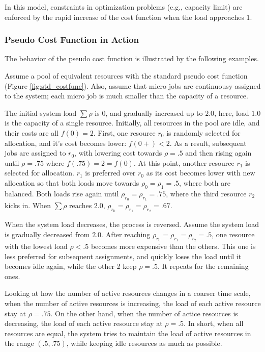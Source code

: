 In this model, constraints in optimization problems (e.g.,
capacity limit) are enforced by the rapid increase of the cost function when
the load approaches $1$. 

\subsubsection{Pseudo Cost Function in Action}

The behavior of the pseudo cost function is illustrated by the
following examples.

Assume a pool of equivalent resources with the standard pseudo cost
function (Figure \ref{fig:std_costfunc}).
Also, assume that micro jobs are continuousy assigned to the
system; each micro job is much smaller than the capacity of a
resource.

The initial system load $\sum \rho$ is $0$, and gradually increased
up to $2.0$, here, load $1.0$ is the capacity of a single resource.
Initially, all resources in the pool are idle, and their costs are
all $f(0)= 2$.
First, one resource $r_{0}$ is randomly selected for allocation, and it's
cost becomes lower: $f(0+) < 2$. As a result, subsequent jobs are
assigned to $r_{0}$, with lowering cost towards $\rho = .5$ and then
rising again until $\rho = .75$ where $f(.75) = 2 = f(0)$.
At this point, another resource $r_{1}$ is selected for allocation.
$r_{1}$ is preferred over $r_{0}$ as its cost becomes lower with new
allocation so that both loads move towards $\rho_{0} = \rho_{1} = .5$,
where both are balanced.
Both loads rise again until $\rho_{r_{0}} = \rho_{r_{1}} = .75$,
where the third resource $r_{2}$ kicks in.
When $\sum \rho$ reaches $2.0$, $\rho_{r_{0}} = \rho_{r_{1}} = \rho_{r_{2}} = .67$.

When the system load decreases, the process is reversed.
Assume the system load is gradually decreased from $2.0$.
After reaching $\rho_{r_{0}} = \rho_{r_{1}} = \rho_{r_{2}} = .5$,
one resource with the lowest load $\rho < .5$ becomes more expensive
than the others.
This one is less preferred for subsequent assignments, and quickly
loses the load until it becomes idle again, while the other 2 keep
$\rho = .5$. It repeats for the remaining ones.

Looking at how the number of active resources changes in a coarser
time scale,
when the number of active resources is increasing, the load of each
active resource stay at $\rho = .75$.
On the other hand, when the number of actice resources is decreasing,
the load of each active resource stay at $\rho = .5$.
In short, when all resources are equal, the system tries to maintain
the load of active resources in the range $(.5, .75)$, while keeping
idle resources as much as possible.

